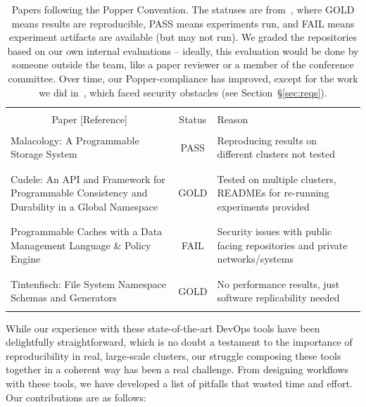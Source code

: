 \begin{table}[t]
\centering
\normalsize
\begin{tabular}{ >{}m{3.2in} | c | >{}m{2.9in} }
&\\
\multicolumn{1}{c|}{Paper [Reference]} & Status & Reason\\ \hline
&\\
Malacology: A Programmable Storage System~\cite{sevilla:eurosys17-malacology}
& PASS
& Reproducing results on different clusters not tested\\ 
&\\\hdashline
&\\
Cudele: An API and Framework for Programmable Consistency and Durability in a Global Namespace~\cite{sevilla:ipdps18-cudele}
& GOLD 
& Tested on multiple clusters, READMEs for re-running experiments provided\\
&\\\hdashline
&\\
Programmable Caches with a Data Management Language \& Policy Engine~\cite{sevilla:ccgrid18-parsplice}
& FAIL 
& Security issues with public facing repositories and private networks/systems\\
&\\\hdashline
&\\
Tintenfisch: File System Namespace Schemas and Generators~\cite{sevilla:techreport18-tintenfisch}
& GOLD 
& No performance results, just software replicability needed\\
&\\
\end{tabular}

\caption{Papers following the Popper Convention. The statuses are
from~\cite{jimenez:rr18-popper}, where GOLD means results are reproducible,
PASS means experiments run, and FAIL means experiment artifacts are available
(but may not run). We graded the repositories based on our own internal
evaluations -- ideally, this evaluation would be done by someone outside the
team, like a paper reviewer or a member of the conference committee. Over time,
our Popper-compliance has improved, except for the work we did
in~\cite{sevilla:ccgrid18-parsplice}, which faced security obstacles (see
Section~\S\ref{sec:reqs}).}

\label{table:papers}
\end{table}

While our experience with these state-of-the-art
DevOps tools have been delightfully straightforward, which is no doubt a
testament to the importance of reproducibility in real, large-scale clusters,
our struggle composing these tools together in a coherent way has been a real
challenge.  From designing workflows with these tools, we have developed a list
of pitfalls that wasted time and effort. Our contributions are as follows:

